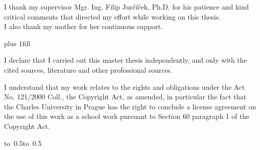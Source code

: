 \documentclass[12pt,a4paper]{report}
\let\openright=\clearpage
\begin{document}
\openright

\noindent
I thank my supervisor Mgr. Ing. Filip Jurčíček, Ph.D. for his patience and kind critical comments that directed my effort while working on this thesis. \\
I also thank my mother for her continuous support.


\newpage


\vglue 0pt plus 1fill


\noindent
I declare that I carried out this master thesis independently, and only with the cited
sources, literature and other professional sources.

\medskip\noindent
I understand that my work relates to the rights and obligations under the Act No.
121/2000 Coll., the Copyright Act, as amended, in particular the fact that the Charles
University in Prague has the right to conclude a license agreement on the use of this
work as a school work pursuant to Section 60 paragraph 1 of the Copyright Act.

\vspace{10mm}

\hbox{\hbox to 0.5\hbox to 0.5}

\vspace{20mm}
\newpage

\end{document}
